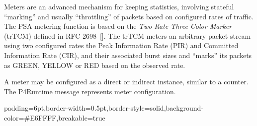 \documentclass[11pt]{article}
\begin{document}
{%
\noindent{}Meters are an advanced mechanism for keeping statistics, involving stateful
\textquotedblleft{}marking\textquotedblright{} and usually \textquotedblleft{}throttling\textquotedblright{} of packets based on configured rates of
traffic. The PSA metering function is based on the \emph{Two Rate Three Color Marker}
(trTCM) defined in RFC 2698~[]. The trTCM meters an arbitrary packet
stream using two configured rates \textemdash{} the Peak Information Rate (PIR) and
Committed Information Rate (CIR), and their associated burst sizes \textemdash{} and
\textquotedblleft{}marks\textquotedblright{} its packets as GREEN, YELLOW or RED based on the observed rate.%

A meter may be configured as a direct or indirect instance, similar to a
counter. The  P4Runtime message represents meter configuration.%

\begin{mdbmargintb}{6pt}{6pt}%
\begin{mdblock}{padding=6pt,border-width=0.5pt,border-style=solid,background-color=\#E6FFFF,breakable=true}%
\begin{mdpre}%
\end{mdpre}%
\end{mdblock}%
\end{mdbmargintb}%

}
\end{document}
